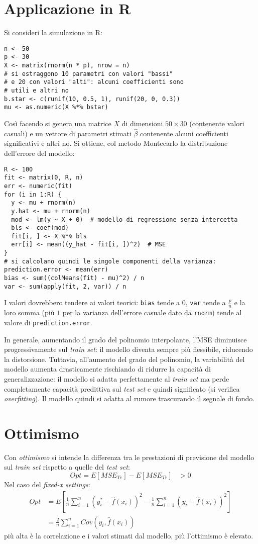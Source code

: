 \documentclass[12pt, a4page]{article}
\begin{document}
\section{Applicazione in R}
Si consideri la simulazione in R:
\begin{verbatim}
n <- 50
p <- 30
X <- matrix(rnorm(n * p), nrow = n)
# si estraggono 10 parametri con valori "bassi"
# e 20 con valori "alti": alcuni coefficienti sono
# utili e altri no
b.star <- c(runif(10, 0.5, 1), runif(20, 0, 0.3))
mu <- as.numeric(X %*% bstar)
\end{verbatim}
Così facendo si genera una matrice $X$ di dimensioni $50 \times 30$ (contenente valori casuali) e un vettore di parametri stimati $\hat{\beta}$ contenente alcuni coefficienti significativi e altri no.
Si ottiene, col metodo Montecarlo la distribuzione dell'errore del modello:
\begin{verbatim}
R <- 100
fit <- matrix(0, R, n)
err <- numeric(fit)
for (i in 1:R) {
  y <- mu + rnorm(n)
  y.hat <- mu + rnorm(n)
  mod <- lm(y ~ X + 0)  # modello di regressione senza intercetta
  bls <- coef(mod)
  fit[i, ] <- X %*% bls
  err[i] <- mean((y_hat - fit[i, ])^2)  # MSE
}
# si calcolano quindi le singole componenti della varianza:
prediction.error <- mean(err)
bias <- sum((colMeans(fit) - mu)^2) / n
var <- sum(apply(fit, 2, var)) / n
\end{verbatim}
I valori dovrebbero tendere ai valori teorici: \verb|bias| tende a 0, \verb|var| tende a $\frac{p}{n}$ e la loro somma (più $1$ per la varianza dell'errore casuale dato da \verb|rnorm|) tende al valore di \verb|prediction.error|.

In generale, aumentando il grado del polinomio interpolante, l'MSE diminuisce progressivamente sul \textit{train set}: il modello diventa sempre più flessibile, riducendo la distorsione.
Tuttavia, all'aumento del grado del polinomio, la variabilità del modello aumenta drasticamente rischiando di ridurre la capacità di generalizzazione: il modello si adatta perfettamente al \textit{train set} ma perde completamente capacità predittiva sul \textit{test set} e quindi significato (si verifica \textit{overfitting}).
Il modello quindi si adatta al rumore trascurando il segnale di fondo.

\section{Ottimismo}
Con \textit{ottimismo} si intende la differenza tra le prestazioni di previsione del modello sul \textit{train set} rispetto a quelle del \textit{test set}:
\begin{equation*}
  Opt = E[MSE_{Te}] - E[MSE_{Tr}] \hspace{10pt} > 0
\end{equation*}
Nel caso del \textit{fixed-x settings}:
\begin{align*}
  Opt &= E[\frac{1}{n} \sum_{i = 1}^n(y_i^* - \hat{f}(x_i))^2 - \frac{1}{n} \sum_{i = 1}^n(y_i - \hat{f}(x_i))^2] \\
  &= \frac{2}{n} \sum_{i=1}^n Cov(y_i, \hat{f}(x_i))
\end{align*}
più alta è la correlazione e i valori stimati dal modello, più l'ottimismo è elevato.
\end{document}
